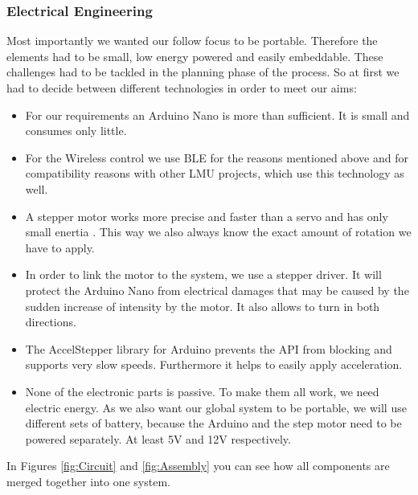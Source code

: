 \documentclass{sigchi}
\begin{document}
\subsubsection{Electrical Engineering}
Most importantly we wanted our follow focus to be portable. Therefore the elements had to be small, low energy powered and easily embeddable. These challenges had to be tackled in the planning phase of the process. So at first we had to decide between different technologies in order to meet our aims:
\begin{itemize}

\item For our requirements an Arduino Nano is more than sufficient. It is small and consumes only little.

\item For the Wireless control we use BLE for the reasons mentioned above and for compatibility reasons with other LMU projects, which use this technology as well.

\item A stepper motor works more precise and faster than a servo and has only small enertia \cite{steppervsservo}. This way we also always know the exact amount of rotation we have to apply.

\item In order to link the motor to the system, we use a stepper driver. It will protect the Arduino Nano from electrical damages that may be caused by the sudden increase of intensity by the motor. It also allows to turn in both directions.
\item The AccelStepper library for Arduino prevents the API from blocking and supports very slow speeds. Furthermore it helps to easily apply acceleration.
\item None of the electronic parts is passive. To make them all work, we need electric energy. As we also want our global system to be portable, we will use different sets of battery, because the Arduino and the step motor need to be powered separately. At least 5V and 12V respectively.
\end{itemize}
In Figures \ref{fig:Circuit} and \ref{fig:Assembly} you can see how all components are merged together into one system.
\end{document}
